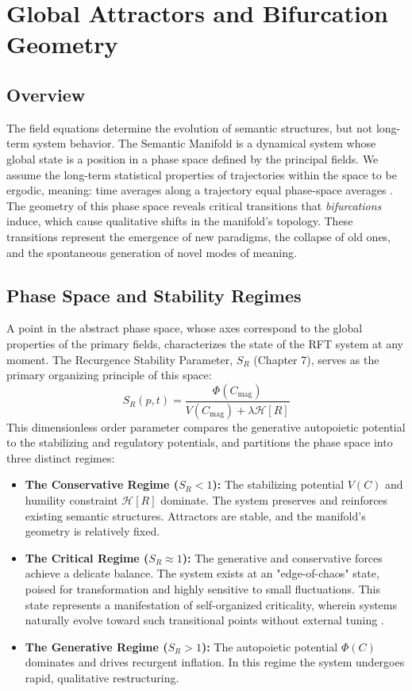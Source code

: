 \chapter{Global Attractors and Bifurcation Geometry}

\section{Overview}

The field equations determine the evolution of semantic structures, but not long-term system behavior. The Semantic Manifold is a dynamical system whose global state is a position in a phase space defined by the principal fields. We assume the long-term statistical properties of trajectories within the space to be ergodic, meaning: time averages along a trajectory equal phase-space averages \autocite{Birkhoff1931}. The geometry of this phase space reveals critical transitions that \textit{bifurcations} induce, which cause qualitative shifts in the manifold's topology. These transitions represent the emergence of new paradigms, the collapse of old ones, and the spontaneous generation of novel modes of meaning.

\section{Phase Space and Stability Regimes}

A point in the abstract phase space, whose axes correspond to the global properties of the primary fields, characterizes the state of the RFT system at any moment. The Recurgence Stability Parameter, \(S_R\) (Chapter 7), serves as the primary organizing principle of this space:
\begin{equation}
S_R(p,t) = \frac{\Phi(C_{\mathrm{mag}})}{V(C_{\mathrm{mag}}) + \lambda \mathcal{H}[R]}
\end{equation}
This dimensionless order parameter compares the generative autopoietic potential to the stabilizing and regulatory potentials, and partitions the phase space into three distinct regimes:
\begin{itemize}
    \item \textbf{The Conservative Regime (\(S_R < 1\)):} The stabilizing potential \(V(C)\) and humility constraint \(\mathcal{H}[R]\) dominate. The system preserves and reinforces existing semantic structures. Attractors are stable, and the manifold's geometry is relatively fixed.
    \item \textbf{The Critical Regime (\(S_R \approx 1\)):} The generative and conservative forces achieve a delicate balance. The system exists at an "edge-of-chaos" state, poised for transformation and highly sensitive to small fluctuations. This state represents a manifestation of self-organized criticality, wherein systems naturally evolve toward such transitional points without external tuning \autocite{BakTangWiesenfeld1987, Kauffman1993}.
    \item \textbf{The Generative Regime (\(S_R > 1\)):} The autopoietic potential \(\Phi(C)\) dominates and drives recurgent inflation. In this regime the system undergoes rapid, qualitative restructuring.
\end{itemize}

